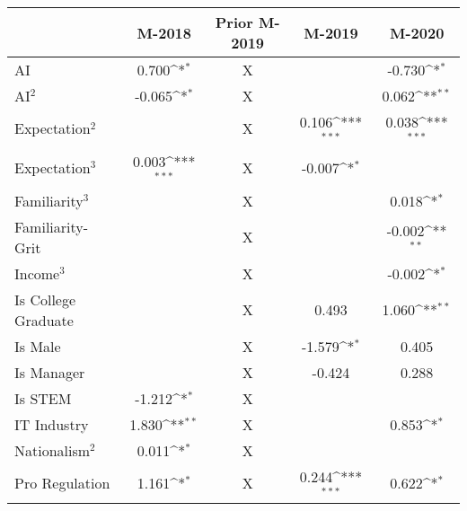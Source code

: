 {
\def\sym#1{\ifmmode^{#1}\else\(^{#1}\)\fi}
\begin{tabular}{l*{4}{c}}
    \toprule
                        & M-2018         & Prior M-2019 & M-2019         & M-2020                  \\
    \midrule
    AI                  & 0.700\sym{*}   & X            &                & -0.730\sym{*}           \\
    \addlinespace
    AI$^2$              & -0.065\sym{*}  & X            &                & 0.062\sym{**}           \\
    \addlinespace
    Expectation$^2$     &                & X            & 0.106\sym{***} & 0.038\sym{***}          \\
    \addlinespace
    Expectation$^3$     & 0.003\sym{***} & X            & -0.007\sym{*}  &                         \\
    \addlinespace
    Familiarity$^3$     &                & X            &                & 0.018\sym{*}            \\
    \addlinespace
    Familiarity-Grit    &                & X            &                & -0.002\sym{**}          \\
    \addlinespace
    Income$^3$          &                & X            &                & -0.002\sym{*}           \\
    \addlinespace
    Is College Graduate &                & X            & 0.493          & 1.060\sym{**}           \\
    \addlinespace
    Is Male             &                & X            & -1.579\sym{*}  & 0.405                   \\
    \addlinespace
    Is Manager          &                & X            & -0.424         & 0.288                   \\
    \addlinespace
    Is STEM             & -1.212\sym{*}  & X            &                &                         \\
    \addlinespace
    IT Industry         & 1.830\sym{**}  & X            &                & 0.853\sym{*}            \\
    \addlinespace
    Nationalism$^2$     & 0.011\sym{*}   & X            &                &                         \\
    \addlinespace
    Pro Regulation      & 1.161\sym{*}   & X            & 0.244\sym{***} & 0.622\sym{*}            \\

\end{tabular}}
